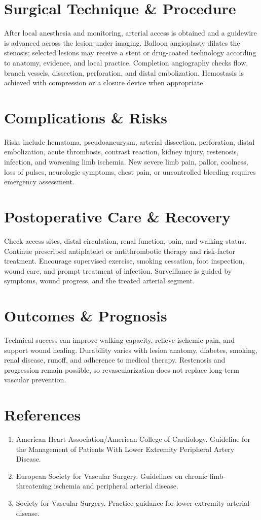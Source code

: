 \section*{Surgical Technique \& Procedure}
After local anesthesia and monitoring, arterial access is obtained and a guidewire is advanced across the lesion under imaging. Balloon angioplasty dilates the stenosis; selected lesions may receive a stent or drug-coated technology according to anatomy, evidence, and local practice. Completion angiography checks flow, branch vessels, dissection, perforation, and distal embolization. Hemostasis is achieved with compression or a closure device when appropriate.

\section*{Complications \& Risks}
Risks include hematoma, pseudoaneurysm, arterial dissection, perforation, distal embolization, acute thrombosis, contrast reaction, kidney injury, restenosis, infection, and worsening limb ischemia. New severe limb pain, pallor, coolness, loss of pulses, neurologic symptoms, chest pain, or uncontrolled bleeding requires emergency assessment.

\section*{Postoperative Care \& Recovery}
Check access sites, distal circulation, renal function, pain, and walking status. Continue prescribed antiplatelet or antithrombotic therapy and risk-factor treatment. Encourage supervised exercise, smoking cessation, foot inspection, wound care, and prompt treatment of infection. Surveillance is guided by symptoms, wound progress, and the treated arterial segment.

\section*{Outcomes \& Prognosis}
Technical success can improve walking capacity, relieve ischemic pain, and support wound healing. Durability varies with lesion anatomy, diabetes, smoking, renal disease, runoff, and adherence to medical therapy. Restenosis and progression remain possible, so revascularization does not replace long-term vascular prevention.

\section*{References}
\begin{enumerate}
\item American Heart Association/American College of Cardiology. Guideline for the Management of Patients With Lower Extremity Peripheral Artery Disease.
\item European Society for Vascular Surgery. Guidelines on chronic limb-threatening ischemia and peripheral arterial disease.
\item Society for Vascular Surgery. Practice guidance for lower-extremity arterial disease.
\end{enumerate}
